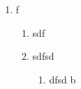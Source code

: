 \documentclass{article}
\begin{document}
\begingroup
{}
\begin{enumerate}[label=\alph*.]
\item f
\begin{enumerate}
\item sdf
\item sdfsd
\begin{enumerate}
\item dfsd b
\end{enumerate}
\end{enumerate}
\end{enumerate}
\endgroup
\end{document}
